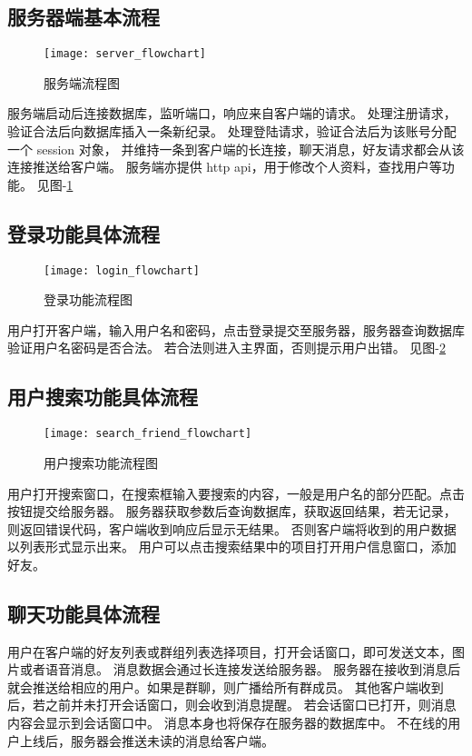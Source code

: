 \subsection{服务器端基本流程}
\begin{figure}[h]
	\centering
	\texttt{[image: server\_flowchart]}
	\caption{服务端流程图} \label{fig:server_flowchart}
\end{figure}

服务端启动后连接数据库，监听端口，响应来自客户端的请求。
处理注册请求，验证合法后向数据库插入一条新纪录。
处理登陆请求，验证合法后为该账号分配一个 session 对象，
并维持一条到客户端的长连接，聊天消息，好友请求都会从该连接推送给客户端。
服务端亦提供 http api，用于修改个人资料，查找用户等功能。
见图-\ref{fig:server_flowchart}


\subsection{登录功能具体流程}
\begin{figure}[h]
	\centering
	\texttt{[image: login\_flowchart]}
	\caption{登录功能流程图} \label{fig:login_flowchart}
\end{figure}
用户打开客户端，输入用户名和密码，点击登录提交至服务器，服务器查询数据库验证用户名密码是否合法。
若合法则进入主界面，否则提示用户出错。
见图-\ref{fig:login_flowchart}


\subsection{用户搜索功能具体流程}
\begin{figure}[h]
	\centering
	\texttt{[image: search\_friend\_flowchart]}
	\caption{用户搜索功能流程图} \label{fig:search_friend_flowchart}
\end{figure}
用户打开搜索窗口，在搜索框输入要搜索的内容，一般是用户名的部分匹配。点击按钮提交给服务器。
服务器获取参数后查询数据库，获取返回结果，若无记录，则返回错误代码，客户端收到响应后显示无结果。
否则客户端将收到的用户数据以列表形式显示出来。
用户可以点击搜索结果中的项目打开用户信息窗口，添加好友。

\subsection{聊天功能具体流程}
用户在客户端的好友列表或群组列表选择项目，打开会话窗口，即可发送文本，图片或者语音消息。
消息数据会通过长连接发送给服务器。
服务器在接收到消息后就会推送给相应的用户。如果是群聊，则广播给所有群成员。
其他客户端收到后，若之前并未打开会话窗口，则会收到消息提醒。
若会话窗口已打开，则消息内容会显示到会话窗口中。
消息本身也将保存在服务器的数据库中。
不在线的用户上线后，服务器会推送未读的消息给客户端。

